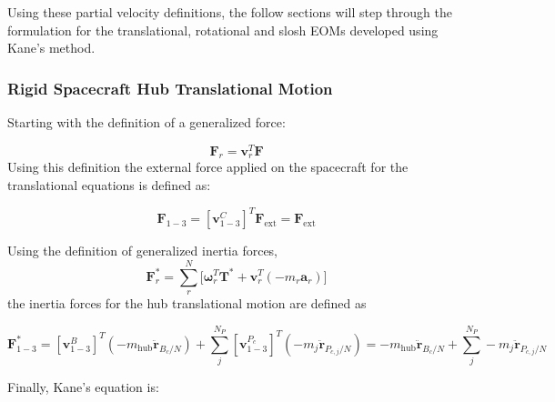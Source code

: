 Using these partial velocity definitions, the follow sections will step through the formulation for the translational, rotational and slosh EOMs developed using Kane's method.

\subsubsection{Rigid Spacecraft Hub Translational Motion}

Starting with the definition of a generalized force:

\begin{equation}
	\bm F_r = \bm v_r^T \bm F
	\label{eq:genActive}
\end{equation}
Using this definition the external force applied on the spacecraft for the translational equations is defined as:

\begin{equation}
	\bm F_{1-3} = [\bm v^C_{1-3}]^T \bm F_{\text{ext}} = \bm F_{\text{ext}}
\end{equation}

Using the definition of generalized inertia forces,
\begin{equation}
	\bm F^*_r = \sum\limits_{r}^{N}\Big[\bm \omega_r^T \bm T^* +  \bm v_r^T (- m_r \bm a_r)\Big]
	\label{eq:genInert}
\end{equation}
the inertia forces for the hub translational motion are defined as

\begin{equation}
	\bm F^*_{1-3} = [\bm v^B_{1-3}]^T (-m_{\text{hub}} \ddot{\bm r}_{B_c/N}) + \sum\limits_{j}^{N_P}[\bm v^{P_c}_{1-3}]^T (-m_j \ddot{\bm r}_{P_{c,j}/N}) = -m_{\text{hub}} \ddot{\bm r}_{B_c/N} + \sum\limits_{j}^{N_P} -m_j \ddot{\bm r}_{P_{c,j}/N}
\end{equation}

Finally, Kane's equation is:

